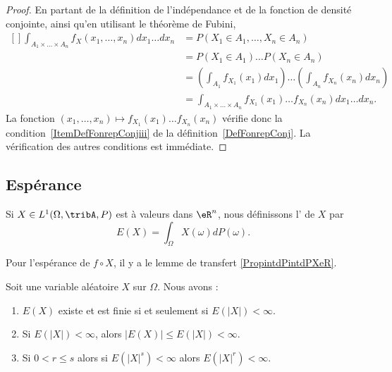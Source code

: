 \begin{proof}
	En partant de la définition de l'indépendance et de la fonction de densité conjointe, ainsi qu'en utilisant le théorème de Fubini,
	\begin{equation}
		\begin{aligned}[]
			\int_{A_1\times \ldots\times A_n}f_X(x_1,\ldots,x_n)dx_1\ldots dx_n & =
			P(X_1\in A_1,\ldots,X_n\in A_n)                                                                                                                                 \\
			                                                                    & =P(X_1\in A_1)\ldots P(X_n\in A_n)                                                        \\
			                                                                    & =\left( \int_{A_1}f_{X_1}(x_1)dx_1 \right)\ldots\left( \int_{A_n}f_{X_n}(x_n)dx_n \right) \\
			                                                                    & =\int_{A_1\times\ldots\times A_n}f_{X_1}(x_1)\ldots f_{X_n}(x_n)dx_1\ldots dx_n.
		\end{aligned}
	\end{equation}
	La fonction \( (x_1,\ldots,x_n)\mapsto f_{X_1}(x_1)\ldots f_{X_n}(x_n)\) vérifie donc la condition~\ref{ItemDefFonrepConjiii} de la définition~\ref{DefFonrepConj}. La vérification des autres conditions est immédiate.
\end{proof}


\subsection{Espérance}

\begin{definition}      \label{DEFooQKFBooCBZtRG}
	Si \( X\in L^1(\Omega,\tribA,P)\) est à valeurs dans \( \eR^n\), nous définissons l' de \( X\) par
	\begin{equation}        \label{EqdCBLst}
		E(X)=\int_{\Omega}X(\omega)dP(\omega).
	\end{equation}
\end{definition}

Pour l'espérance de \( f\circ X\), il y a le lemme de transfert \ref{PropintdPintdPXeR}.

\begin{proposition}		\label{PROPooESPWooAfLmeW}
	Soit une variable aléatoire \( X\) sur \( \Omega\). Nous avons :
	\begin{enumerate}
		\item		\label{ITEMooWSJVooAlZSBZ}
		      \( E(X)\) existe et est finie si et seulement si \( E(| X |)<\infty\).
		\item		\label{ITEMooLDFWooXjyZyz}
		      Si \( E(| X |)<\infty\), alors \( | E(X) |\leq E(| X |)<\infty\).
		\item		\label{ITEMooFJCTooEBeFaz}
		      Si \( 0<r\leq s\) alors si \( E(| X |^s)<\infty\) alors \( E(| X |^r)<\infty\).
	\end{enumerate}
\end{proposition}

